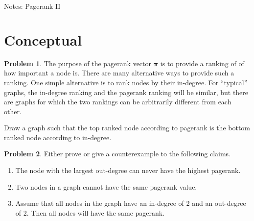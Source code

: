 \documentclass[10pt]{article}
\theoremstyle{definition}
\newtheorem{problem}{Problem}
\newcommand{\pr}{\bm \pi}
\begin{document}
\begin{center}
{
\Huge
Notes: Pagerank II
}

\end{center}

\begin{center}
\end{center}


\section{Conceptual}

%
\begin{problem}
    The purpose of the pagerank vector $\pr$ is to provide a ranking of of how important a node is.
    There are many alternative ways to provide such a ranking.
    One simple alternative is to rank nodes by their in-degree.
    For ``typical'' graphs, the in-degree ranking and the pagerank ranking will be similar,
    but there are graphs for which the two rankings can be arbitrarily different from each other.

    Draw a graph such that the top ranked node according to pagerank is the bottom ranked node according to in-degree.
\end{problem}

\newpage
\begin{problem}
    Either prove or give a counterexample to the following claims.

    \begin{enumerate}
        \item
            The node with the largest out-degree can never have the highest pagerank.
            \newpage
        \item
            Two nodes in a graph cannot have the same pagerank value.
            \newpage
        \item
            Assume that all nodes in the graph have an in-degree of 2 and an out-degree of 2.
            Then all nodes will have the same pagerank.
            \newpage
    \end{enumerate}
\end{problem}

\end{document}

